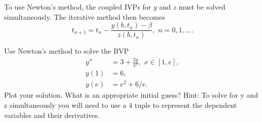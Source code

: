 To use Newton's method, the coupled IVPs for $y$ and $z$ must be solved simultaneously. The iterative method then becomes 
\[
t_{n+1} = t_n - \frac{ y(b,t_n) - \beta}{z(b,t_n)}, \,\, n = 0,1,\hdots
.\]
% 
% 	
% 	
% 		
% 



\begin{problem}
Use Newton's method to solve the BVP
\begin{equation*}
\begin{split}
y'' &= 3 + \frac{2y}{x^2}, \,\, x \in [1,e],\\
y(1) &= 6, \\
y(e) &= e^2 + 6/e.
\end{split}
\end{equation*}
Plot your solution. What is an appropriate initial guess?
Hint: To solve for y and z simultaneously you will need to use a 4 tuple to represent the dependent variables and their derivatives.
\end{problem}


